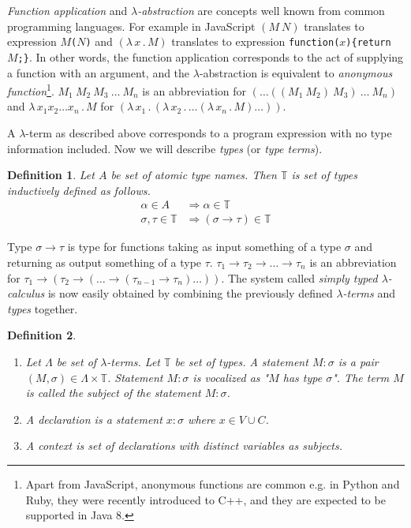\documentclass[conference]{IEEEtran}
\newtheorem{definition}{Definition}
\newcommand{\lterm}{$\lambda$-term\xspace}
\newcommand{\lterms}{$\lambda$-terms\xspace}
\newcommand{\then}{\Rightarrow\xspace}
\newcommand{\lamb}[2]{( \lambda \, #1 \, . \, #2 )}
\newcommand{\lam}[2]{\lambda \, #1 \, . \, #2}
\newcommand{\ar}{\rightarrow\xspace}
\newcommand{\T}{\mathbb{T}\xspace}
\begin{document}
\textit{Function application} and 
\textit{$\lambda$-abstraction} are concepts
well known from common programming languages. 
For example in JavaScript 
$(M~N)$ translates to expression \texttt{$M$($N$)} and
$\lamb{x}{M}$ translates to expression \texttt{function($x$)\{return $M$;\}}.
In other words, the function application 
corresponds to the act of supplying a function 
with an argument, and
the $\lambda$-abstraction is equivalent to 
\textit{anonymous function}\footnote{Apart from JavaScript, anonymous functions are common e.g. in Python and Ruby, 
they were recently introduced to C++, and they are expected to be supported in Java 8.}.
$M_1~M_2~M_3~\dots~M_n$ is an abbreviation for $(\dots((M_1~M_2)~M_3)~\dots~M_n)$
and $\lam{x_1 x_2 \dots x_n }{M}$ for $\lamb{x_1}{\lamb{x_2}{\dots\lamb{x_n}{M}\dots}}$.

A \lterm as described above
corresponds to a program expression with no type information
included. Now we will describe \textit{types} (or \textit{type terms}).

\begin{definition}
Let $A$ be set of {\it atomic type names}. 
Then $\mathbb{T}$ is set of {\it types} inductively defined as follows.
\begin{align*}
\alpha      \in A  &\then   \alpha \in \T \\
\sigma,\tau \in \T &\then ( \sigma \ar  \tau ) \in \T 
\end{align*}
\end{definition}

Type $\sigma \ar \tau$ is type for functions taking as input
something of a type $\sigma$ and returning 
as output something of a type $\tau$. 
$\tau_1 \ar \tau_2 \ar \dots \ar \tau_n$ is an abbreviation for 
$\tau_1 \ar (\tau_2 \ar (\dots \ar (\tau_{n-1} \ar \tau_n)\dots))$.
The system called \textit{simply typed $\lambda$-calculus} is now easily obtained by
combining the previously defined \textit{\lterms} and \textit{types} together. 


\begin{definition}\begin{enumerate}
 \item 	Let $\Lambda$ be set of {\it \lterms}. 
	Let $\mathbb{T}$ be set of {\it types}.       
	A {\it statement} $M : \sigma$ is a pair 
	$(M,\sigma) \in \Lambda \times \mathbb{T}$.
	Statement $M : \sigma$ is vocalized as 
	{\it "$M$ has type $\sigma$"}.
	The term $M$ is called the {\it subject} of the 
	statement $M : \sigma$.
 \item A \textit{declaration} is a statement 
 $x : \sigma$ where $x \in V \cup C$.
  
 \item A \textit{context} 
 is set of declarations with distinct variables as subjects.
\end{enumerate}
\end{definition}
\end{document}
